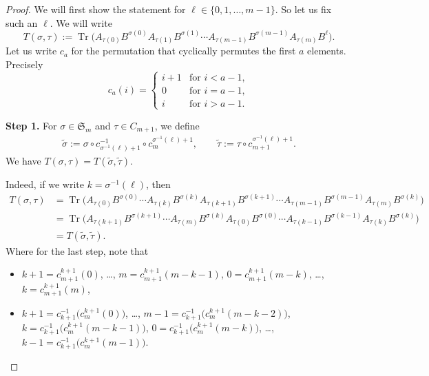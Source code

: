 \documentclass[10pt,a4paper]{amsart}
\numberwithin{equation}{section}
\DeclareMathOperator{\Tr}{Tr}
\begin{document}
\begin{proof}
	We will first show the statement for $\ell \in \{0,1,\dots,m-1\}$. So let us fix such an $\ell$. We will write
	\[T(\sigma,\tau) := \Tr\big(A_{\tau(0)}B^{\sigma(0)}A_{\tau(1)}B^{\sigma(1)} \cdots A_{\tau(m-1)}B^{\sigma(m-1)}A_{\tau(m)}B^{\ell}\big).\]
	Let us write $c_{a}$ for the permutation that cyclically permutes the first $a$ elements. Precisely
	\[c_{a}(i) =
	\begin{cases}
		i+1 & \text{for } i<a-1, \\
		0 & \text{for } i=a-1, \\
		i & \text{for } i>a-1.
	\end{cases}\]

{\bf Step 1.}
	For $\sigma \in \mathfrak{S}_m$ and $\tau \in C_{m+1}$, we define{\samepage
	\begin{gather*}
	\tilde{\sigma} := \sigma \circ c_{\sigma^{-1}(\ell)+1}^{-1} \circ c_{m}^{\sigma^{-1}(\ell)+1}, \qquad
	\tilde{\tau} := \tau \circ c_{m+1}^{\sigma^{-1}(\ell)+1}.
	\end{gather*}
	We have $T(\sigma,\tau) = T(\tilde{\sigma}, \tilde{\tau})$.}
	
	Indeed, if we write $k=\sigma^{-1}(\ell)$, then
	\begin{align*}
	T(\sigma,\tau) &= \Tr\big(A_{\tau(0)}B^{\sigma(0)}\cdots A_{\tau(k)}B^{\sigma(k)}A_{\tau(k+1)}B^{\sigma(k+1)} \cdots A_{\tau(m-1)}B^{\sigma(m-1)}A_{\tau(m)}B^{\sigma(k)}\big)\\
	&=\Tr\big(A_{\tau(k+1)}B^{\sigma(k+1)} \cdots A_{\tau(m)}B^{\sigma(k)}A_{\tau(0)}B^{\sigma(0)} \cdots A_{\tau(k-1)}B^{\sigma(k-1)}A_{\tau(k)}B^{\sigma(k)}\big)\\
	&=T(\tilde{\sigma}, \tilde{\tau}).
	\end{align*}
	Where for the last step, note that
	\begin{itemize}\itemsep=0pt
		\item $k+1 = c_{m+1}^{k+1}(0)$, \dots, $m=c_{m+1}^{k+1}(m-k-1)$, $0=c_{m+1}^{k+1}(m-k)$, \dots, $k=c_{m+1}^{k+1}(m)$,
		\item $k+1=c_{k+1}^{-1}\big(c_m^{k+1}(0)\big)$, \dots, $m-1=c_{k+1}^{-1}\big(c_m^{k+1}(m-k-2)\big)$, $k=c_{k+1}^{-1}\big(c_m^{k+1}(m-k-1)\big)$, $0=c_{k+1}^{-1}\big(c_m^{k+1}(m-k)\big)$, \dots, $k-1=c_{k+1}^{-1}\big(c_m^{k+1}(m-1)\big)$.
	\end{itemize}


\end{proof}
\end{document}
